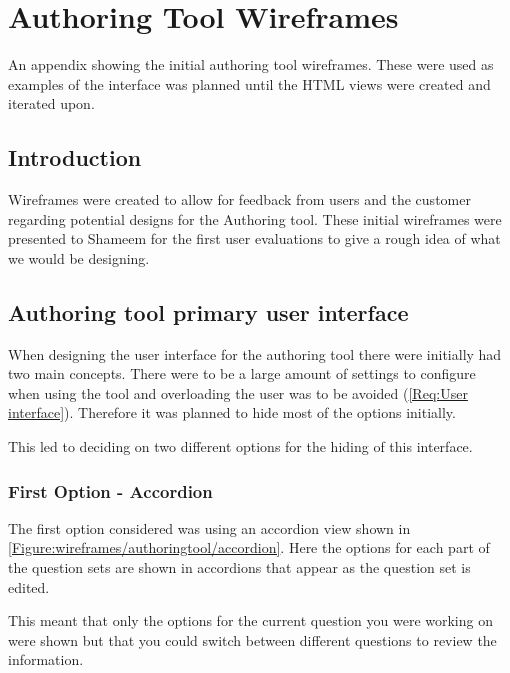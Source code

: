 \chapter{Authoring Tool Wireframes} \label{App:Authoring Tool Wireframes}

\begin{preamble}
	An appendix showing the initial authoring tool wireframes. These were used as examples of the interface was planned until the HTML views were created and iterated upon.
\end{preamble}

\section{Introduction}

Wireframes were created to allow for feedback from users and the customer regarding potential designs for the Authoring tool. These initial wireframes were presented to Shameem for the first user evaluations to give a rough idea of what we would be designing.

\section{Authoring tool primary user interface}

When designing the user interface for the authoring tool there were initially had two main concepts. There were to be a large amount of settings to configure when using the tool and overloading the user was to be avoided (\cref{Req:User interface}). Therefore it was planned to hide most of the options initially.

This led to deciding on two different options for the hiding of this interface.

\subsection{First Option - Accordion} 

The first option considered was using an accordion view shown in \autoref{Figure:wireframes/authoringtool/accordion}. Here the options for each part of the question sets are shown in accordions that appear as the question set is edited.

This meant that only the options for the current question you were working on were shown but that you could switch between different questions to review the information.

